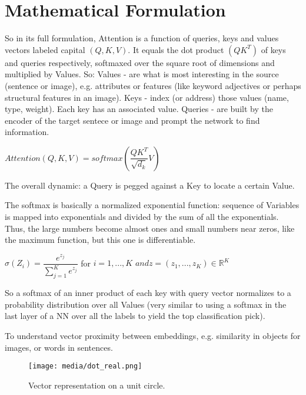 \section{Mathematical Formulation}

So in its full formulation, Attention is a function of queries, keys and values 
vectors labeled capital $(Q,K,V)$. 
It equals the dot product $(QK^T)$ of keys and queries respectively, softmaxed over 
the square root of dimensions and multiplied by Values.
So:
Values - are what is most interesting in the source (sentence or image), 
e.g. attributes or features (like keyword adjectives or perhaps structural 
features in an image).
Keys - index (or address) those values (name, type, weight). Each key has an 
associated value. Queries - are built by the encoder of the target sentece or 
image and prompt the network to find information. 

\begin{center}
	$ Attention(Q, K, V) = softmax(\dfrac{QK^T}{\sqrt{d_k}} V ) $
	\end{center}

The overall dynamic: a Query is pegged against a Key to locate a certain Value.	

The softmax is basically a normalized exponential function: sequence of Variables is 
mapped into exponentials and divided by the sum of all the exponentials. Thus, the 
large numbers become almost ones and small numbers near zeros, like the maximum 
function, but this one is differentiable. 

\begin{center}
	$ \displaystyle\sigma(Z_i) = \dfrac{e^{z_j}}{\sum_{j=1}^K e^{z_j}}$ for $i=1,...,K$ $and z=(z_1,...,z_K) \in \mathbb{R}^K $
	\end{center}

So a softmax of an inner product of each key with query vector normalizes to a 
probability distribution over all Values (very similar to using a softmax in the last 
layer of a NN over all the labels to yield the top classification pick). 


To understand vector proximity between embeddings, e.g. similarity in objects for images, or words in sentences.

\begin{figure}[H]
	\begin{center}
	\texttt{[image: media/dot\_real.png]}
	\end{center}
	\caption[Vector Representation]{Vector representation on a unit circle.}
	\end{figure}

